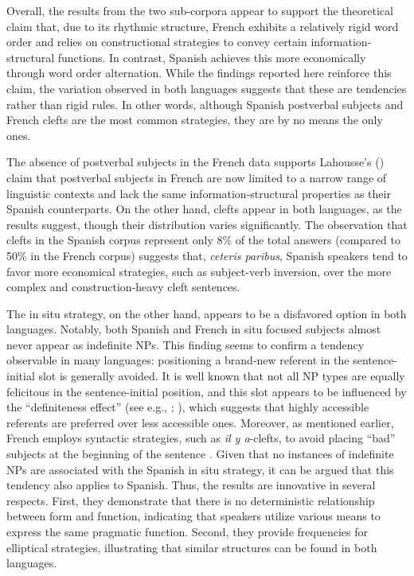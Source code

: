 {Overall, the results from the two sub-corpora appear to support the theoretical claim that, due to its rhythmic structure, French exhibits a relatively rigid word order and relies on constructional strategies to convey certain information-struc\-tur\-al functions. In contrast, Spanish achieves this more economically through word order alternation. While the findings reported here reinforce this claim, the variation observed in both languages suggests that these are tendencies rather than rigid rules. In other words, although Spanish postverbal subjects and French clefts are the most common strategies, they are by no means the only ones.

The absence of postverbal subjects in the French data supports Lahousse's (\citeyear{lahousse2006, Lahousse2011}) claim that postverbal subjects in French are now limited to a narrow range of linguistic contexts and lack the same information-structural properties as their Spanish counterparts. On the other hand, clefts appear in both languages, as the results suggest, though their distribution varies significantly. The observation that clefts in the Spanish corpus represent only 8\% of the total answers (compared to 50\% in the French corpus) suggests that, \textit{ceteris paribus}, Spanish speakers tend to favor more economical strategies, such as subject-verb inversion, over the more complex and construction-heavy cleft sentences.

The in situ strategy, on the other hand, appears to be a disfavored option in both languages. Notably, both Spanish and French in situ focused subjects almost never appear as indefinite NPs. This finding seems to confirm a tendency observable in many languages: positioning a brand-new referent in the sentence-initial slot is generally avoided. It is well known that not all NP types are equally felicitous in the sentence-initial position, and this slot appears to be influenced by the ``definiteness effect” (see e.g., \cite{keenan1976foregrounding}; \cite{mcnally1998existential}), which suggests that highly accessible referents are preferred over less accessible ones. Moreover, as mentioned earlier, French employs syntactic strategies, such as \textit{il y a}-clefts, to avoid placing ``bad” subjects at the beginning of the sentence \parencite{Karssenberg+2018}. Given that no instances of indefinite NPs are associated with the Spanish in situ strategy, it can be argued that this tendency also applies to Spanish.
Thus, the results are innovative in several respects. First, they demonstrate that there is no deterministic relationship between form and function, indicating that speakers utilize various means to express the same pragmatic function. Second, they provide frequencies for elliptical strategies, illustrating that similar structures can be found in both languages.

}
